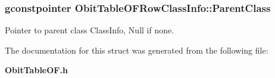 \subsubsection{\setlength{\rightskip}{0pt plus 5cm}gconstpointer {\bf Obit\-Table\-OFRow\-Class\-Info::Parent\-Class}}\label{structObitTableOFRowClassInfo_o3}


Pointer to parent class Class\-Info, Null if none. 



The documentation for this struct was generated from the following file:\begin{CompactItemize}
\item 
{\bf Obit\-Table\-OF.h}\end{CompactItemize}
